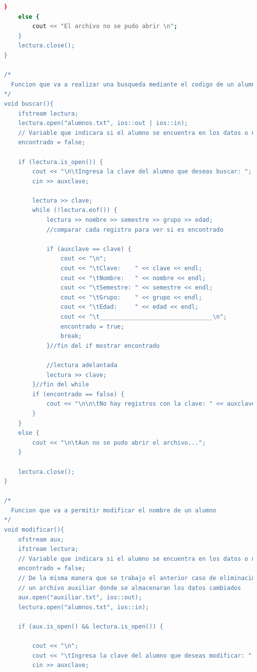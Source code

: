 \documentclass[12pt]{article}
\begin{document}
\begin{lstlisting}[language=bash,frame=single,style=CStyle]
    }
    else {
        cout << "El archivo no se pudo abrir \n";
    }
    lectura.close();
}

/*
  Funcion que va a realizar una busqueda mediante el codigo de un alumno si existe lo muestra
*/
void buscar(){
    ifstream lectura;
    lectura.open("alumnos.txt", ios::out | ios::in);
    // Variable que indicara si el alumno se encuentra en los datos o no
    encontrado = false;

    if (lectura.is_open()) {
        cout << "\n\tIngresa la clave del alumno que deseas buscar: ";
        cin >> auxclave;

        lectura >> clave;
        while (!lectura.eof()) {
            lectura >> nombre >> semestre >> grupo >> edad;
            //comparar cada registro para ver si es encontrado

            if (auxclave == clave) {
                cout << "\n";
                cout << "\tClave:    " << clave << endl;
                cout << "\tNombre:   " << nombre << endl;
                cout << "\tSemestre: " << semestre << endl;
                cout << "\tGrupo:    " << grupo << endl;
                cout << "\tEdad:     " << edad << endl;
                cout << "\t________________________________\n";
                encontrado = true;
                break;
            }//fin del if mostrar encontrado

            //lectura adelantada
            lectura >> clave;
        }//fin del while
        if (encontrado == false) {
            cout << "\n\n\tNo hay registros con la clave: " << auxclave << "\n\n\t\t\t";
        }
    }
    else {
        cout << "\n\tAun no se pudo abrir el archivo...";
    }

    lectura.close();
}

/*
  Funcion que va a permitir modificar el nombre de un alumno
*/
void modificar(){
    ofstream aux;
    ifstream lectura;
    // Variable que indicara si el alumno se encuentra en los datos o no
    encontrado = false;
    // De la misma manera que se trabajo el anterior caso de eliminacion, tambien se va a necesitar
    // un archivo auxiliar donde se almacenaran los datos cambiados
    aux.open("auxiliar.txt", ios::out);
    lectura.open("alumnos.txt", ios::in);

    if (aux.is_open() && lectura.is_open()) {

        cout << "\n";
        cout << "\tIngresa la clave del alumno que deseas modificar: ";
        cin >> auxclave;


\end{lstlisting}
\end{document}
